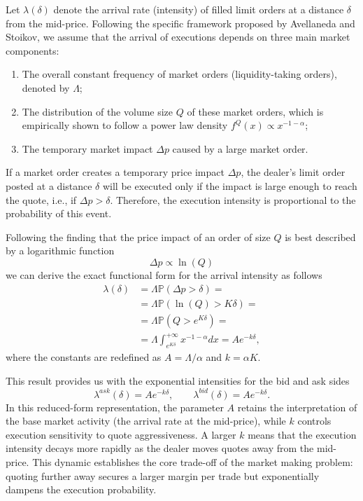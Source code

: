 \documentclass[a4paper,10pt,titlepage,oneside,openany]{book}
\theoremstyle{plain}\newtheorem{theorem}{Theorem}[chapter]
\theoremstyle{definition}\newtheorem{definition}{Definition}[chapter]
\theoremstyle{remark}\newtheorem{remark}{Remark}[chapter]
\begin{document}
Let $\lambda(\delta)$ denote the arrival rate (intensity) of filled limit orders at a distance $\delta$ from the mid-price. Following the specific framework proposed by Avellaneda and Stoikov, we assume that the arrival of executions depends on three main market components:
\begin{enumerate}
    \item The overall constant frequency of market orders (liquidity-taking orders), denoted by $\Lambda$;
    \item The distribution of the volume size $Q$ of these market orders, which is empirically shown to follow a power law density $f^Q(x) \propto x^{-1-\alpha}$;
    \item The temporary market impact $\Delta p$ caused by a large market order.
\end{enumerate}
If a market order creates a temporary price impact $\Delta p$, the dealer's limit order posted at a distance $\delta$ will be executed only if the impact is large enough to reach the quote, i.e., if $\Delta p>\delta$. Therefore, the execution intensity is proportional to the probability of this event.

Following the finding that the price impact of an order of size $Q$ is best described by a logarithmic function 
\[
\Delta p \propto \ln{(Q)} 
\]
we can derive the exact functional form for the arrival intensity as follows
\begin{align*}
    \lambda(\delta)&=\Lambda \mathbb{P}(\Delta p>\delta)=\\
    &=\Lambda \mathbb{P}(\ln{(Q)}>K\delta)=\\
    &=\Lambda \mathbb{P}(Q>e^{K\delta})=\\
    &=\Lambda \int_{e^{K\delta}}^{+\infty}x^{-1-\alpha}dx= Ae^{-k\delta},
\end{align*}
where the constants are redefined as $A = \Lambda /\alpha$ and $k=\alpha K$.

This result provides us with the exponential intensities for the bid and ask sides
\[
\lambda^{ask}(\delta)=Ae^{-k\delta}, \qquad \lambda^{bid}(\delta)=Ae^{-k\delta}.
\]
In this reduced-form representation, the parameter $A$ retains the interpretation of the base market activity (the arrival rate at the mid-price), while $k$ controls execution sensitivity to quote aggressiveness. A larger $k$ means that the execution intensity decays more rapidly as the dealer moves quotes away from the mid-price. This dynamic establishes the core trade-off of the market making problem: quoting further away secures a larger margin per trade but exponentially dampens the execution probability.
\end{document}
